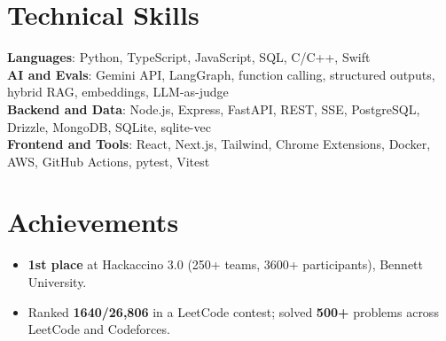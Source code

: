 \documentclass[letterpaper,11pt]{article}
\newcommand{\resumeItem}[1]{\item\small{{#1 \vspace{-2pt}}}}
\newcommand{\resumeItemListStart}{\begin{itemize}}
\newcommand{\resumeItemListEnd}{\end{itemize}\vspace{-5pt}}
\begin{document}
\section{Technical Skills}
 \begin{itemize}[leftmargin=0.15in, label={}]
    \small{\item{
     \textbf{Languages}{: Python, TypeScript, JavaScript, SQL, C/C++, Swift} \\
     \textbf{AI and Evals}{: Gemini API, LangGraph, function calling, structured outputs, hybrid RAG, embeddings, LLM-as-judge} \\
     \textbf{Backend and Data}{: Node.js, Express, FastAPI, REST, SSE, PostgreSQL, Drizzle, MongoDB, SQLite, sqlite-vec} \\
     \textbf{Frontend and Tools}{: React, Next.js, Tailwind, Chrome Extensions, Docker, AWS, GitHub Actions, pytest, Vitest}
    }}
 \end{itemize}

\section{Achievements}
  \resumeItemListStart
    \resumeItem{\textbf{1st place} at Hackaccino 3.0 (250+ teams, 3600+ participants), Bennett University.}
    \resumeItem{Ranked \textbf{1640/26,806} in a LeetCode contest; solved \textbf{500+} problems across LeetCode and Codeforces.}
  \resumeItemListEnd
\end{document}
